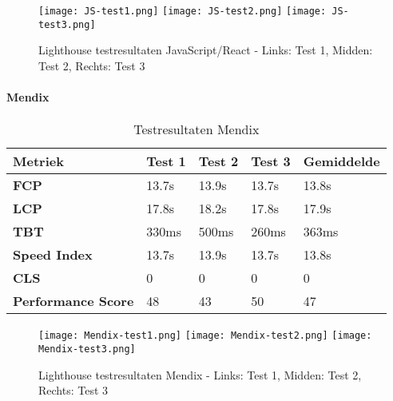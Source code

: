 \begin{figure}[htbp]
    \centering
    \texttt{[image: JS-test1.png]}
    \hfill
    \texttt{[image: JS-test2.png]}
    \hfill
    \texttt{[image: JS-test3.png]}
    \caption{Lighthouse testresultaten JavaScript/React - Links: Test 1, Midden: Test 2, Rechts: Test 3}
    \label{fig:javascript-simple}
\end{figure}

\newpage
\paragraph{Mendix}

\begin{table}[h]
    \centering
    \begin{tabular}{ |p{3cm}|p{2.75cm}|p{2.75cm}|p{2.75cm}|p{2.75cm}|}
        \hline
        \textbf{Metriek} & \textbf{Test 1} & \textbf{Test 2}  & \textbf{Test 3} & \textbf{Gemiddelde}\\
        \hline
        \textbf{\gls{FCP}}  & 13.7s & 13.9s & 13.7s & 13.8s \\
        \hline
        \textbf{\gls{LCP}} & 17.8s & 18.2s & 17.8s & 17.9s\\
        \hline
        \textbf{\gls{TBT}}  & 330ms & 500ms & 260ms & 363ms \\
        \hline
        \textbf{Speed Index}  & 13.7s & 13.9s & 13.7s & 13.8s \\
        \hline
        \textbf{\gls{CLS}}  & 0 & 0  & 0 & 0 \\
        \hline
        \textbf{Performance Score}  & 48 & 43  & 50 & 47 \\
        \hline
    \end{tabular}
    \caption[\centering Testresultaten laadtijd Mendix]{\label{tab:Testresultaten Mendix}Testresultaten Mendix}
\end{table}

\begin{figure}[htbp]
    \centering
    \texttt{[image: Mendix-test1.png]}
    \hfill
    \texttt{[image: Mendix-test2.png]}
    \hfill
    \texttt{[image: Mendix-test3.png]}
    \caption{Lighthouse testresultaten Mendix - Links: Test 1, Midden: Test 2, Rechts: Test 3}
    \label{fig:mendix-simple}
\end{figure}
\newpage
